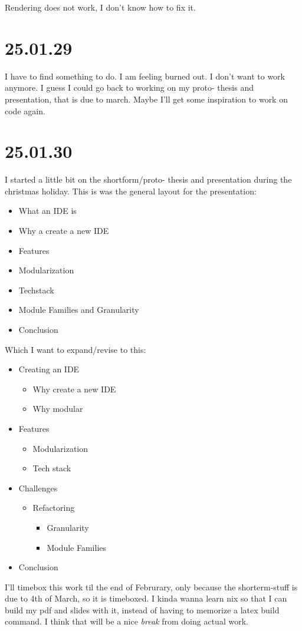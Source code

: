 Rendering does not work, I don't know how to fix it.


\section{25.01.29}

I have to find something to do. I am feeling burned out. I don't want to work
anymore. I guess I could go back to working on my proto- thesis and presentation,
that is due to march. Maybe I'll get some inspiration to work on code again.


\section{25.01.30}

I started a little bit on the shortform/proto- thesis and presentation during
the christmas holiday. This is was the general layout for the presentation:

\begin{itemize}
  \item What an IDE is
  \item Why a create a new IDE
  \item Features
  \item Modularization
  \item Techstack
  \item Module Families and Granularity
  \item Conclusion
\end{itemize}

Which I want to expand/revise to this:

\begin{itemize}
  \item Creating an IDE
  \begin{itemize}
    \item Why create a new IDE
    \item Why modular
  \end{itemize}
  \item Features
  \begin{itemize}
    \item Modularization
    \item Tech stack
  \end{itemize}
  \item Challenges
  \begin{itemize}
    \item Refactoring
    \begin{itemize}
      \item Granularity
      \item Module Families
    \end{itemize}
  \end{itemize}
  \item Conclusion
\end{itemize}

I'll timebox this work til the end of Februrary, only because the shorterm-stuff
is due to 4th of March, so it is timeboxed. I kinda wanna learn nix so that I
can build my pdf and slides with it, instead of having to memorize a latex build
command. I think that will be a nice \textit{break} from doing actual work.
